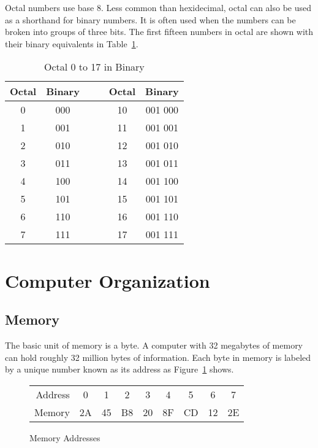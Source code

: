 Octal numbers use base 8. Less common than hexidecimal, octal can also be
used as a shorthand for binary numbers.  It is often used when the numbers
can be broken into groups of three bits.  The first fifteen numbers in octal are shown with their binary equivalents in Table~\ref{tab:oct-bin}.
\begin{table}[t]
\begin{center}
\begin{tabular}{||c|c||cc||c|c||}
\hline
Octal & Binary & & & Octal & Binary \\
\hline
0       & 000   & & & 10       & 001 000 \\
\hline
1       & 001   & & & 11       & 001 001 \\
\hline
2       & 010   & & & 12      & 001 010 \\
\hline
3       & 011   & & & 13      & 001 011 \\
\hline
4       & 100   & & & 14      & 001 100 \\
\hline
5       & 101   & & & 15      & 001 101 \\
\hline
6       & 110   & & & 16      & 001 110 \\
\hline
7       & 111   & & & 17      & 001 111 \\
\hline
\end{tabular}
\caption{Octal 0 to 17 in Binary\label{tab:oct-bin}}
\end{center}
\end{table}


\section{Computer Organization}

\subsection{Memory}

The basic unit of memory is a byte.  A computer with 32 megabytes of memory can hold roughly 32
million bytes of information. Each byte in memory is labeled by a
unique number known as its address as Figure~\ref{fig:memory} shows.

\begin{figure}[ht]
\begin{center}
\begin{tabular}{rcccccccc}
Address & 0 & 1 & 2 & 3 & 4 & 5 & 6 & 7 \\
\cline{2-9}
Memory & \multicolumn{1}{|c}{2A}  & \multicolumn{1}{|c}{45}
       & \multicolumn{1}{|c}{B8} & \multicolumn{1}{|c}{20}
       & \multicolumn{1}{|c}{8F} & \multicolumn{1}{|c}{CD}
       & \multicolumn{1}{|c}{12} & \multicolumn{1}{|c|}{2E} \\
\cline{2-9}
\end{tabular}
\caption{ Memory Addresses \label{fig:memory} }
\end{center}
\end{figure}

